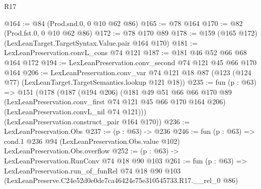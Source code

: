 \begin{lexlean}{R17}
\begin{coremodule}
@164 := @84 (Prod.snd.{0, 0} @10 @62 @86)
@165 := @78 @164
@170 := @82 (Prod.fst.{0, 0} @10 @62 @86)
@172 := @78 @170 @89
@178 := @159 (@165 @172) (LexLeanTarget.TargetSyntax.Value.pair @164 @170)
@181 := LexLeanPreservation.convL_cons @74 @121
@187 := @181 @46 @52 @66 @68 @164 @172
@194 := LexLeanPreservation.conv_second @74 @121 @45 @66 @170 @164
@206 := LexLeanPreservation.conv_var
    @74
    @121
    @18
    @87
    (@123 (@124 @77) (LexLeanTarget.TargetSemantics.lookup @121 @18))
@235 := fun (p : @63) =>
  @151
    (@178
      (@187
        (@194 @206)
        (@181
          @49
          @51
          @66
          @66
          @170
          @89
          (LexLeanPreservation.conv_first @74 @121 @45 @66 @170 @164 @206)
          (LexLeanPreservation.convL_nil @74 @121)))
      (LexLeanPreservation.construct_pair @164 @170))
@236 := LexLeanPreservation.Obs
@237 := (p : @63) -> @236
@246 := fun (p : @63) =>
  cond.{1} @236 @94 (LexLeanPreservation.Obs.value @102) LexLeanPreservation.Obs.overflow
@252 := (p : @63) -> LexLeanPreservation.RunConv @74 @18 @90 @103
@261 := fun (p : @63) =>
  LexLeanPreservation.run_of_funRel
    @74
    @18
    @90
    @103
    (LexLeanPreserve.C24e52d0e0de7ca46424e75e310545733.R17.__rel_0 @86)
\end{coremodule}
\end{lexlean}
